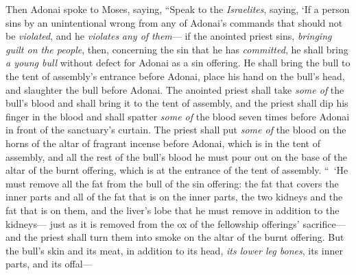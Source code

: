 \begin{biblechapter} %
 Then Adonai spoke to Moses, saying,
\verse “Speak to the \textit{Israelites}, saying, ‘If a person sins by an unintentional wrong from any of Adonai’s commands that should not be \textit{violated}, and he \textit{violates} \textit{any of them}—
\verse if the anointed priest sins, \textit{bringing guilt on the people}, then, concerning the sin that he has \textit{committed}, he shall bring \textit{a young bull} without defect for Adonai as a sin offering.
\verse He shall bring the bull to the tent of assembly’s entrance before Adonai, place his hand on the bull’s head, and slaughter the bull before Adonai.
\verse The anointed priest shall take \textit{some of} the bull’s blood and shall bring it to the tent of assembly,
\verse and the priest shall dip his finger in the blood and shall spatter \textit{some of} the blood seven times before Adonai in front of the sanctuary’s curtain.
\verse The priest shall put \textit{some of} the blood on the horns of the altar of fragrant incense before Adonai, which is in the tent of assembly, and all the rest of the bull’s blood he must pour out on the base of the altar of the burnt offering, which is at the entrance of the tent of assembly.
\verse “ ‘He must remove all the fat from the bull of the sin offering: the fat that covers the inner parts and all of the fat that is on the inner parts,
\verse the two kidneys and the fat that is on them, and the liver’s lobe that he must remove in addition to the kidneys—
\verse just as it is removed from the ox of the fellowship offerings’ sacrifice—and the priest shall turn them into smoke on the altar of the burnt offering.
\verse But the bull’s skin and its meat, in addition to its head, \textit{its lower leg bones}, its inner parts, and its offal—

\end{biblechapter}
